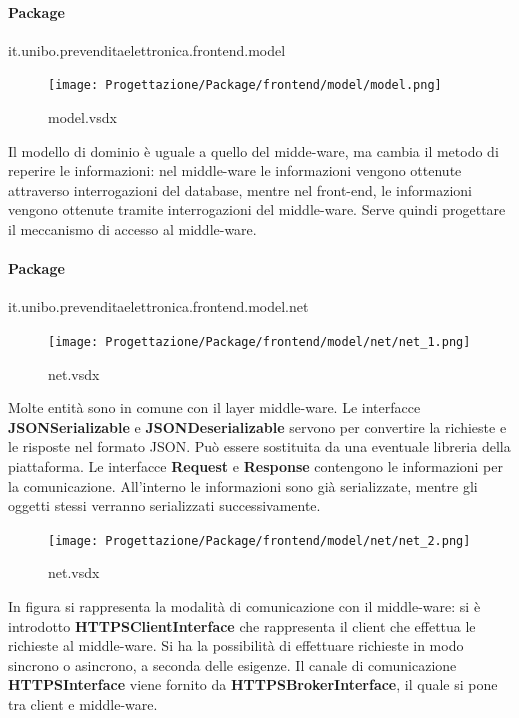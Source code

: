 \documentclass[a4paper]{article}
\begin{document}
\newpage

\paragraph{Package} it.unibo.prevenditaelettronica.frontend.model

\begin{figure}[H]
    \texttt{[image: Progettazione/Package/frontend/model/model.png]}
    \centering
    \caption{model.vsdx}
\end{figure}

Il modello di dominio è uguale a quello del midde-ware, ma cambia il metodo di reperire le informazioni: nel middle-ware le informazioni vengono ottenute attraverso interrogazioni del database, mentre nel front-end, le informazioni vengono ottenute tramite interrogazioni del middle-ware. Serve quindi progettare il meccanismo di accesso al middle-ware.

\newpage

\paragraph{Package} it.unibo.prevenditaelettronica.frontend.model.net



\begin{figure}[H]
    \texttt{[image: Progettazione/Package/frontend/model/net/net\_1.png]}
    \centering
    \caption{net.vsdx}
\end{figure}

Molte entità sono in comune con il layer middle-ware. Le interfacce \textbf{JSONSerializable} e \textbf{JSONDeserializable} servono per convertire la richieste e le risposte nel formato JSON. Può essere sostituita da una eventuale libreria della piattaforma. Le interfacce \textbf{Request} e \textbf{Response} contengono le informazioni per la comunicazione. All'interno le informazioni sono già serializzate, mentre gli oggetti stessi verranno serializzati successivamente.


\begin{figure}[H]
    \texttt{[image: Progettazione/Package/frontend/model/net/net\_2.png]}
    \centering
    \caption{net.vsdx}
\end{figure}

In figura si rappresenta la modalità di comunicazione con il middle-ware: si è introdotto \textbf{HTTPSClientInterface} che rappresenta il client che effettua le richieste al middle-ware. Si ha la possibilità di effettuare richieste in modo sincrono o asincrono, a seconda delle esigenze. Il canale di comunicazione \textbf{HTTPSInterface} viene fornito da \textbf{HTTPSBrokerInterface}, il quale si pone tra client e middle-ware.
\end{document}
